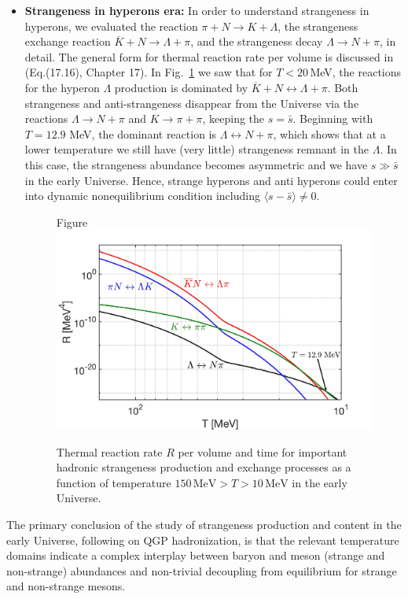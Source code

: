 \documentclass[universe,article,submit,moreauthors,pdftex,a4paper]{Definitions/mdpi}
\begin{document}
\begin{itemize}


\item \textbf{Strangeness in hyperons era:}
In order to understand strangeness in hyperons, we evaluated the reaction $\pi +N\rightarrow K+\Lambda$, the strangeness exchange reaction $\overline{K}+N\rightarrow \Lambda+\pi$, and the strangeness decay $\Lambda\rightarrow N+\pi$, in detail. The general form for thermal reaction rate per volume is discussed in~\cite{Letessier:2002gp} (Eq.(17.16), Chapter 17). In Fig.~\ref{Lambda_Rate_volume.fig} we saw that for $T<20$\,MeV, the reactions for the hyperon $\Lambda$ production is dominated by $\overline{K}+N\leftrightarrow\Lambda+\pi$. Both strangeness and anti-strangeness disappear from the Universe via the reactions $\Lambda\rightarrow N+\pi$ and $K\to\pi+\pi$, keeping the $s=\bar s$. Beginning with $T=12.9$ MeV, the dominant reaction is $\Lambda\leftrightarrow N+\pi$, which shows that at a lower temperature we still have (very little) strangeness remnant in the $\Lambda$. In this case, the strangeness abundance becomes asymmetric and we have $s\gg\bar{s}$ in the early Universe. Hence, strange hyperons and anti hyperons could enter into dynamic nonequilibrium condition including $\langle s-\bar s\rangle \ne 0$.


\begin{figure}[h]
\begin{center}
\centering
Figure \includegraphics[width=0.8\linewidth]{NewHyperonRate_CTYang.jpg}
\caption{Thermal reaction rate $R$ per volume and time for important hadronic strangeness production and exchange processes as a function of temperature $150\,\mathrm{MeV}> T>10\,\mathrm{MeV}$ in the early Universe.}
\label{Lambda_Rate_volume.fig}
\end{center}
\end{figure}
\end{itemize}
The primary conclusion of the study of strangeness production and content in the early Universe, following on QGP hadronization, is that the relevant temperature domains indicate a complex interplay between baryon and meson (strange and non-strange) abundances and non-trivial decoupling from equilibrium for strange and non-strange mesons.
\end{document}
